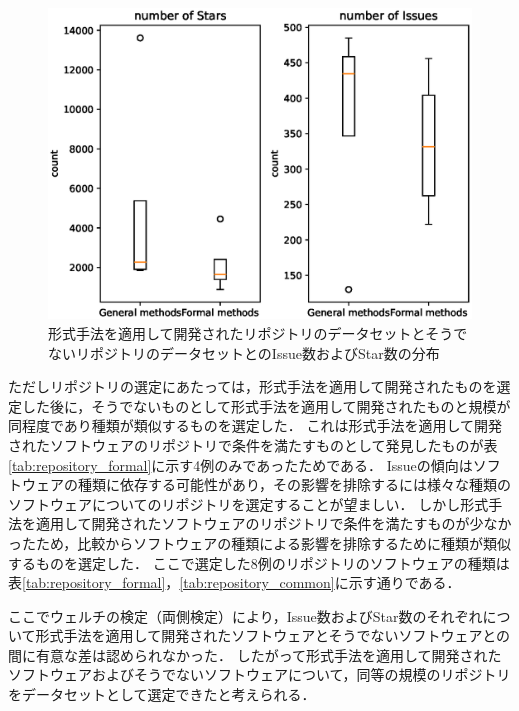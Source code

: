 \documentclass[main]{subfiles}
\begin{document}
\begin{figure}[p]
	\centering
	\includegraphics[width=\hsize]{figures/boxplot.eps}
	\caption{形式手法を適用して開発されたリポジトリのデータセットとそうでないリポジトリのデータセットとのIssue数およびStar数の分布}
	\label{fig:boxplot}
\end{figure}

ただしリポジトリの選定にあたっては，形式手法を適用して開発されたものを選定した後に，そうでないものとして形式手法を適用して開発されたものと規模が同程度であり種類が類似するものを選定した．
これは形式手法を適用して開発されたソフトウェアのリポジトリで条件を満たすものとして発見したものが表\ref{tab:repository_formal}に示す4例のみであったためである．
Issueの傾向はソフトウェアの種類に依存する可能性があり，その影響を排除するには様々な種類のソフトウェアについてのリポジトリを選定することが望ましい．
しかし形式手法を適用して開発されたソフトウェアのリポジトリで条件を満たすものが少なかったため，比較からソフトウェアの種類による影響を排除するために種類が類似するものを選定した．
ここで選定した8例のリポジトリのソフトウェアの種類は表\ref{tab:repository_formal}，\ref{tab:repository_common}に示す通りである．

ここでウェルチの検定（両側検定）により，Issue数およびStar数のそれぞれについて形式手法を適用して開発されたソフトウェアとそうでないソフトウェアとの間に有意な差は認められなかった．
したがって形式手法を適用して開発されたソフトウェアおよびそうでないソフトウェアについて，同等の規模のリポジトリをデータセットとして選定できたと考えられる．
\end{document}
